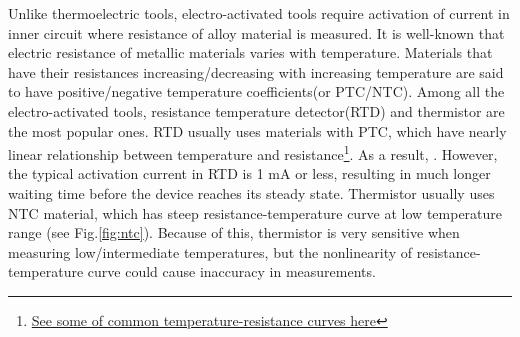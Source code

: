 Unlike thermoelectric tools, electro-activated tools require activation of current in inner circuit where resistance of alloy material is measured. It is well-known that electric resistance of metallic materials varies with temperature. Materials that have their resistances increasing/decreasing with increasing temperature are said to have positive/negative temperature coefficients(or PTC/NTC). Among all the electro-activated tools, resistance temperature detector(RTD) and thermistor are the most popular ones. RTD usually uses materials with PTC, which have nearly linear relationship between temperature and resistance\footnote{\href{https://www.te.com/usa-en/industries/sensor-solutions/insights/understanding-rtds.html?gclid=CjwKCAjwpKCDBhBPEiwAFgBzj9uMIm1BxZoP0VSCeXPknE0WwvLcBD-PecdvHpXxdz3BS3VTQAeTWBoCeD0QAvD_BwE}{See some of common temperature-resistance curves here}}. As a result, . However, the typical activation current in RTD is 1 mA or less, resulting in much longer waiting time before the device reaches its steady state. Thermistor usually uses NTC material, which has steep resistance-temperature curve at low temperature range (see Fig.\ref{fig:ntc}). Because of this, thermistor is very sensitive when measuring low/intermediate temperatures, but the nonlinearity of resistance-temperature curve could cause inaccuracy in measurements.
